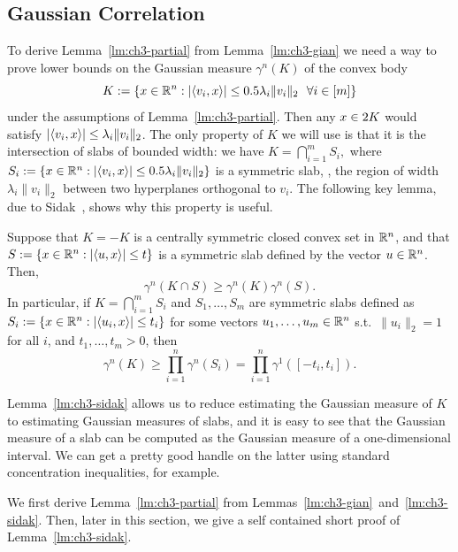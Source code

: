 \subsection{Gaussian Correlation}


To derive Lemma~\ref{lm:ch3-partial} from Lemma~\ref{lm:ch3-gian} we
need a way to prove lower bounds on the Gaussian measure $\gamma^n(K)$
of the convex body
\[
K:= \{x \in \mathbb{R}^n: |\langle v_i,x\rangle| \le 0.5 \lambda_i\|v_i\|_2 \ \ \forall i
\in [m]\}
\]
under the assumptions of Lemma~\ref{lm:ch3-partial}. Then any $x \in 2K$ would satisfy $|\langle v_i,x\rangle| \le \lambda_i\|v_i\|_2$. The only
property of \(K\) we will use is that it is the intersection of slabs
of bounded width: we have
\(
K = \bigcap_{i = 1}^m S_i,
\)
where
\(
S_i := \{x \in \mathbb{R}^n: |\langle v_i,x\rangle| \le 0.5 \lambda_i\|v_i\|_2 \}
\)
is a symmetric slab, \ie, the region of width \(\lambda_i\|v_i\|_2\) between two hyperplanes orthogonal to
\(v_i\). The following key lemma, due to Sidak~\cite{Sidak67}, shows
why this property is useful. 

\begin{lemma}\label{lm:ch3-sidak}
  Suppose that \(K = -K\) is a centrally symmetric closed convex set in
  \(\mathbb{R}^n\), and that \(S := \{x \in \mathbb{R}^n: |\langle u,x\rangle| \le t\}\) is a
  symmetric slab defined by the vector \(u \in \mathbb{R}^n\). Then,
  \begin{equation}\label{eq:ch3-sidak}
  \gamma^n(K \cap S) \ge \gamma^n(K) \gamma^n(S).
  \end{equation}
  In particular, if \(K = \bigcap_{i = 1}^m S_i\) and \(S_1, \ldots,
  S_m\) are symmetric slabs defined as \(S_i := \{x \in \mathbb{R}^n:
  |\langle u_i,x\rangle| \le t_i\}\) for some vectors \(u_1, \ldots, u_m \in
  \mathbb{R}^n\) s.t.~$\|u_i\|_2 = 1$ for all $i$, and $t_1, \ldots, t_m > 0$, then
  \[
    \gamma^n(K) \ge \prod_{i = 1}^n \gamma^n(S_i) =
    \prod_{i =  1}^n\gamma^1\left(\left[-t_i,t_i\right]\right).
  \]
\end{lemma}

Lemma~\ref{lm:ch3-sidak} allows us to reduce estimating the Gaussian
measure of \(K\) to estimating Gaussian measures
of slabs, and it is easy to see that the Gaussian measure of a slab can be computed as the Gaussian measure of a one-dimensional interval. We can get a pretty good handle on the
latter using standard concentration inequalities, for example.

We first derive Lemma~\ref{lm:ch3-partial} from
Lemmas~\ref{lm:ch3-gian}~and~\ref{lm:ch3-sidak}. Then, later in this
section, we give a self contained short proof of
Lemma~\ref{lm:ch3-sidak}.

